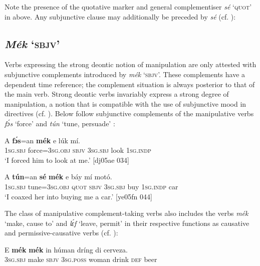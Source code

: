 Note the presence of the quotative marker and general complementiser \textit{sé} ‘\textsc{quot}’ in  above. Any subjunctive clause may additionally be preceded by \textit{sé} (cf. ):

\subsection{\textit{Mék} ‘\textsc{sbjv}’} \label{sec:10.5.5}

Verbs expressing the strong deontic notion of manipulation are only attested with subjunctive complements introduced by \textit{mék} ‘\textsc{sbjv}’. These complements have a dependent time reference; the complement situation is always posterior to that of the main verb. Strong deontic verbs invariably express a strong degree of manipulation, a notion that is compatible with the use of subjunctive mood in directives (cf. ). Below follow subjunctive complements of the manipulative verbs \textit{fɔ́s} ‘force’  and \textit{tún} ‘tune, persuade’ :


\ea%
    \label{ex:key:1397}
    \gll \MakeUppercase{A}   \textbf{fɔ́s}=an    \textbf{mék}    e    lúk    mí.\\
\textsc{1sg.sbj}  force=\textsc{3sg.obj}  \textsc{sbjv}    \textsc{3sg.sbj}  look    \textsc{1sg.indp}\\

\glt ‘I forced him to look at me.’ [dj05ae 034]
\z


\ea%
    \label{ex:key:1398}
    \gll \MakeUppercase{A}   \textbf{tún}=an    \textbf{sé}    \textbf{mék}   e    báy    mí    motó.\\
\textsc{1sg.sbj}  tune=\textsc{3sg.obj}  \textsc{quot}    \textsc{sbjv}    \textsc{3sg.sbj}  buy    \textsc{1sg.indp}  car\\

\glt ‘I coaxed her into buying me a car.’ [ye05fn 044]
\z

The class of manipulative complement-taking verbs also includes the verbs \textit{mék} ‘make, cause to’  and \textit{lɛ́f} ‘leave, permit’ in their respective functions as causative and permis\-sive-causative verbs (cf. ):{\fff}


\ea%
    \label{ex:key:1399}
    \gll E    \textbf{mék}    \textbf{mék}    in    húman  dríng  di  cerveza.\\
\textsc{3sg.sbj}  make  \textsc{sbjv}    \textsc{3sg.poss}  woman  drink  \textsc{def}  beer\\

